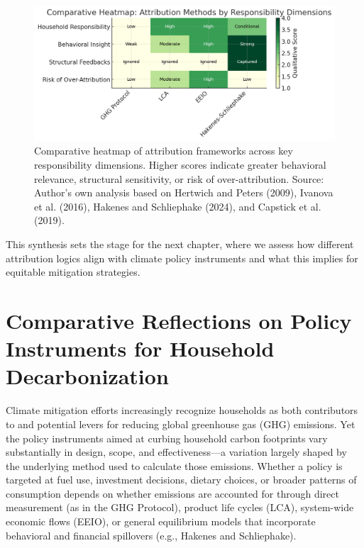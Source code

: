 \documentclass[12pt,a4paper]{article}%
\begin{document}
\begin{figure}[h]
    \centering
    \includegraphics[width=\textwidth]{attribution_heatmap.png}
    \caption{Comparative heatmap of attribution frameworks across key responsibility dimensions. Higher scores indicate greater behavioral relevance, structural sensitivity, or risk of over-attribution. Source: Author's own analysis based on Hertwich and Peters (2009), Ivanova et al. (2016), Hakenes and Schliephake (2024), and Capstick et al. (2019).}
    \label{fig:heatmap}
\end{figure}

\noindent
This synthesis sets the stage for the next chapter, where we assess how different attribution logics align with climate policy instruments and what this implies for equitable mitigation strategies.

\section{Comparative Reflections on Policy Instruments for Household Decarbonization}

Climate mitigation efforts increasingly recognize households as both contributors to and potential levers for reducing global greenhouse gas (GHG) emissions. Yet the policy instruments aimed at curbing household carbon footprints vary substantially in design, scope, and effectiveness—a variation largely shaped by the underlying method used to calculate those emissions. Whether a policy is targeted at fuel use, investment decisions, dietary choices, or broader patterns of consumption depends on whether emissions are accounted for through direct measurement (as in the GHG Protocol), product life cycles (LCA), system-wide economic flows (EEIO), or general equilibrium models that incorporate behavioral and financial spillovers (e.g., Hakenes and Schliephake).
\end{document}
